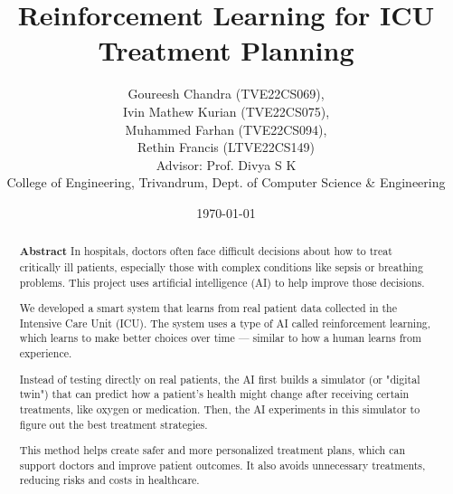 \documentclass[14pt]{article}
\title{\fontsize{20pt}{24pt}\selectfont \textbf{Reinforcement Learning for ICU Treatment Planning}}
\author{%
Goureesh Chandra (TVE22CS069),\\ 
Ivin Mathew Kurian (TVE22CS075), \\
Muhammed Farhan (TVE22CS094), \\
Rethin Francis (LTVE22CS149) \\
\vspace{1cm}
Advisor: Prof. Divya S K \\
College of Engineering, Trivandrum, Dept. of Computer Science \& Engineering
}
\date{\today}
\begin{document}
\onehalfspacing
\maketitle

\renewcommand{\abstractname}{}
\begin{abstract}
\centering
\fontsize{16pt}{20pt}\selectfont \textbf{Abstract}
\vspace{0.5cm}
\justify
\fontsize{12pt}{15pt}\selectfont
\noindent In hospitals, doctors often face difficult decisions about how to treat critically ill patients, especially those with complex conditions like sepsis or breathing problems. This project uses artificial intelligence (AI) to help improve those decisions.

\noindent We developed a smart system that learns from real patient data collected in the Intensive Care Unit (ICU). The system uses a type of AI called reinforcement learning, which learns to make better choices over time — similar to how a human learns from experience.

\noindent Instead of testing directly on real patients, the AI first builds a simulator (or "digital twin") that can predict how a patient's health might change after receiving certain treatments, like oxygen or medication. Then, the AI experiments in this simulator to figure out the best treatment strategies.

\noindent This method helps create safer and more personalized treatment plans, which can support doctors and improve patient outcomes. It also avoids unnecessary treatments, reducing risks and costs in healthcare.
\end{abstract}
\end{document}
